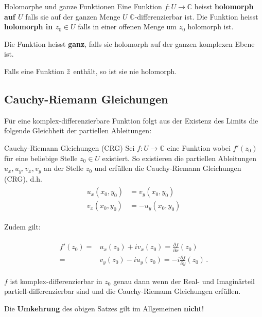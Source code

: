 \documentclass[a4paper,10pt]{article}
\def\C{\mathbb{C}}
\newcommand{\overbar}[1]{\mkern 1.5mu\overline{\mkern-1.5mu#1\mkern-1.5mu}\mkern 1.5mu}
\begin{document}
\begin{mainbox}{Holomorphe und ganze Funktionen}
  Eine Funktion $f: U \to \C$ heisst \textbf{holomorph auf $U$} falls sie auf der ganzen Menge $U$ $\C$-differenzierbar ist. Die Funktion heisst \textbf{holomorph in $z_0 \in U$} falls in einer offenen Menge um $z_0$ holomorph ist.

  Die Funktion heisst \textbf{ganz}, falls sie holomorph auf der ganzen komplexen Ebene ist.
\end{mainbox}

Falls eine Funktion $\overbar{z}$ enthält, so ist sie nie holomorph.

\subsection{Cauchy-Riemann Gleichungen}

Für eine komplex-differenzierbare Funktion folgt aus der Existenz des Limits die folgende Gleichheit der partiellen Ableitungen:

\begin{mainbox}{Cauchy-Riemann Gleichungen (CRG)}
  Sei \(f \colon U \to \mathbb{C}\) eine Funktion wobei \(f'(z_0)\) für eine beliebige Stelle \(z_0 \in U\) existiert. So existieren die partiellen Ableitungen \(u_x,u_y,v_x,v_y\) an der Stelle \(z_0\) und erfüllen die Cauchy‐Riemann Gleichungen (CRG), d.h.
  \begin{align*} 
    \begin{aligned}
       u_x (x_0,y_0)&=v_y (x_0,y_0)\\ 
       v_x (x_0,y_0) &=-u_y (x_0,y_0)
    \end{aligned}
  \end{align*}
  
  Zudem gilt:
  
  \begin{align*}
    \begin{aligned}
      f'(z_0) =& u_x(z_0) + i v_x (z_0) = \frac{\partial f}{\partial x}(z_0)\\
       =& v_y(z_0) - i u_y (z_0) = - i \frac{\partial f}{\partial y}(z_0)\,. 
    \end{aligned}
  \end{align*}

  $f$ ist komplex-differenzierbar in $z_0$ genau dann wenn der Real- und Imaginärteil partiell-differenzierbar sind und die Cauchy-Riemann Gleichungen erfüllen.
\end{mainbox}

Die \textbf{Umkehrung} des obigen Satzes gilt im Allgemeinen \textbf{nicht}!
\end{document}
